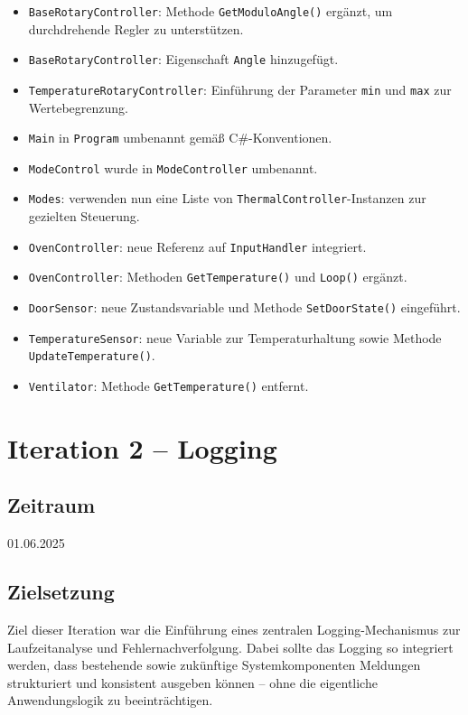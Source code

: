\documentclass[a4paper,12pt]{article}
\begin{document}
\begin{itemize}
    \item \texttt{BaseRotaryController}: Methode \texttt{GetModuloAngle()} ergänzt, um durchdrehende Regler zu unterstützen.
    \item \texttt{BaseRotaryController}: Eigenschaft \texttt{Angle} hinzugefügt.
    \item \texttt{TemperatureRotaryController}: Einführung der Parameter \texttt{min} und \texttt{max} zur Wertebegrenzung.
    \item \texttt{Main} in \texttt{Program} umbenannt gemäß C\#-Konventionen.
    \item \texttt{ModeControl} wurde in \texttt{ModeController} umbenannt.
    \item \texttt{Modes}: verwenden nun eine Liste von \texttt{ThermalController}-Instanzen zur gezielten Steuerung.
    \item \texttt{OvenController}: neue Referenz auf \texttt{InputHandler} integriert.
    \item \texttt{OvenController}: Methoden \texttt{GetTemperature()} und \texttt{Loop()} ergänzt.
    \item \texttt{DoorSensor}: neue Zustandsvariable und Methode \texttt{SetDoorState()} eingeführt.
    \item \texttt{TemperatureSensor}: neue Variable zur Temperaturhaltung sowie Methode \texttt{UpdateTemperature()}.
    \item \texttt{Ventilator}: Methode \texttt{GetTemperature()} entfernt.
\end{itemize}

\newpage

\section{Iteration 2 – Logging}
\label{sec:iteration2}

\subsection{Zeitraum}
01.06.2025

\subsection{Zielsetzung}

Ziel dieser Iteration war die Einführung eines zentralen Logging-Mechanismus zur Laufzeitanalyse und Fehlernachverfolgung. Dabei sollte das Logging so integriert werden, dass bestehende sowie zukünftige Systemkomponenten Meldungen strukturiert und konsistent ausgeben können – ohne die eigentliche Anwendungslogik zu beeinträchtigen.
\end{document}
